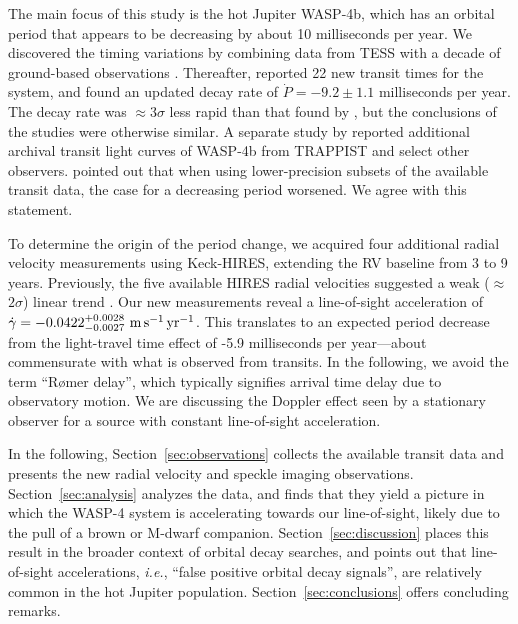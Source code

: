 \documentclass[12pt,twocolumn,tighten]{aastex62}
\begin{document}
The main focus of this study is the hot Jupiter WASP-4b, which has an
orbital period that appears to be decreasing by about 10 milliseconds
per year.  We discovered the timing variations by combining data from
TESS \citep{ricker_transiting_2015} with a decade of ground-based
observations \citep[][hereafter
]{bouma_wasp4b_2019}.  Thereafter,
\citet{southworth_transit_2019} reported 22 new transit times for the
system, and found an updated decay rate of $\dot{P} = -9.2 \pm 1.1$
milliseconds per year. The \citeauthor{southworth_transit_2019} decay
rate was $\approx$3$\sigma$ less rapid than that found by
, but the conclusions of the studies
were otherwise similar.  A separate study by \citet{baluev_2019}
reported additional archival transit light curves of WASP-4b from
TRAPPIST and select other observers.  \citet{baluev_2019} pointed out
that when using lower-precision subsets of the available transit data,
the case for a decreasing period worsened.  We agree with this
statement.

To determine the origin of the period change, we acquired four
additional radial velocity measurements using Keck-HIRES, extending
the RV baseline from 3 to 9 years.  Previously, the five available
HIRES radial velocities suggested a weak ($\approx$$2\sigma$) linear
trend \citep{knutson_friends_2014}.  Our new measurements reveal a
line-of-sight acceleration of $\dot{\gamma} =
-0.0422^{+0.0028}_{-0.0027}\ {\rm m\,s^{-1}\,yr^{-1}}$.  This
translates to an expected period decrease from the light-travel time
effect of -5.9 milliseconds per year---about commensurate with what is
observed from transits.  In the following, we avoid the term
``R{\o}mer delay'', which typically signifies arrival time delay due
to observatory motion. We are discussing the Doppler effect seen by a
stationary observer for a source with constant line-of-sight
acceleration.

In the following, Section~\ref{sec:observations} collects the
available transit data and presents the new radial velocity and
speckle imaging observations.  Section~\ref{sec:analysis} analyzes the
data, and finds that they yield a picture in which the WASP-4 system
is accelerating towards our line-of-sight, likely due to the pull of a
brown or M-dwarf companion.  Section~\ref{sec:discussion} places this
result in the broader context of orbital decay searches, and points
out that line-of-sight accelerations, {\it i.e.}, ``false positive
orbital decay signals'', are relatively common in the hot Jupiter
population.  Section~\ref{sec:conclusions} offers concluding remarks.
\end{document}
